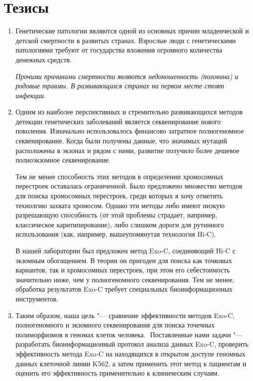 \documentclass[a4paper,14pt]{extarticle}
\begin{document}
\newpage
\section*{Тезисы}
\begin{enumerate}
\item Генетические патологии являются одной из основных причин младенческой и детской смертности в развитых странах.
Взрослые люди с генетическими патологиями требуют от государства вложения огромного количества денежных средств.

\textit{Прочими причинами смертности являются недоношенность (половина) и родовые травмы.
В развивающихся странах на первом месте стоят инфекции.}

\item Одним из наиболее перспективных и стремительно развивающихся методов детекции генетических заболеваний является секвенирование нового поколения.
Изначально использовалось финансово затратное полногеномное секвенирование.
Когда были получены данные, что  значимых мутаций расположены в экзонах и рядом с ними, развитие получило более дешевое полноэкзомное секвенирование.

Тем не менее способность этих методов в определении хромосомных перестроек оставалась ограниченной.
Было предложено множество методов для поиска хромосомных перестроек, среди которых я хочу отметить технолгию захвата хромосом. Однако эти методы либо имеют низкую разрешающую способность (от этой проблемы страдает, например, классическое каритипирование), либо слишком дороги для рутинного использования (как, например, вышеупомянутая технология Hi-C).

В нашей лаборатории был предложен метод Exo-C, соединяющий Hi-C с экзомным обогащением.
В теории он пригоден для поиска как точковых вариантов, так и хромосомных перестроек, при этом его себестоимость значительно ниже, чем у полногеномного секвенирования.
Тем не менее, обработка результатов Exo-C требует специальных биоинформационных инструментов.

\item Таким образом, наша цель "--- сравнение эффективности методов Exo-C, полногеномного и экзомного секвенирования для поиска точечных полиморфизмов в геномах клеток человека. ​
Поставленные нами задачи "--- разработать биоинформационный протокол анализа данных Exo-C, проверить эффективность метода Exo-C на находящихся в открытом доступе геномных данных клеточной линии K562, а затем применить этот метод к пациентам и оценить его эффективность применительно к клиническим случаям.


\end{enumerate}
\end{document}
